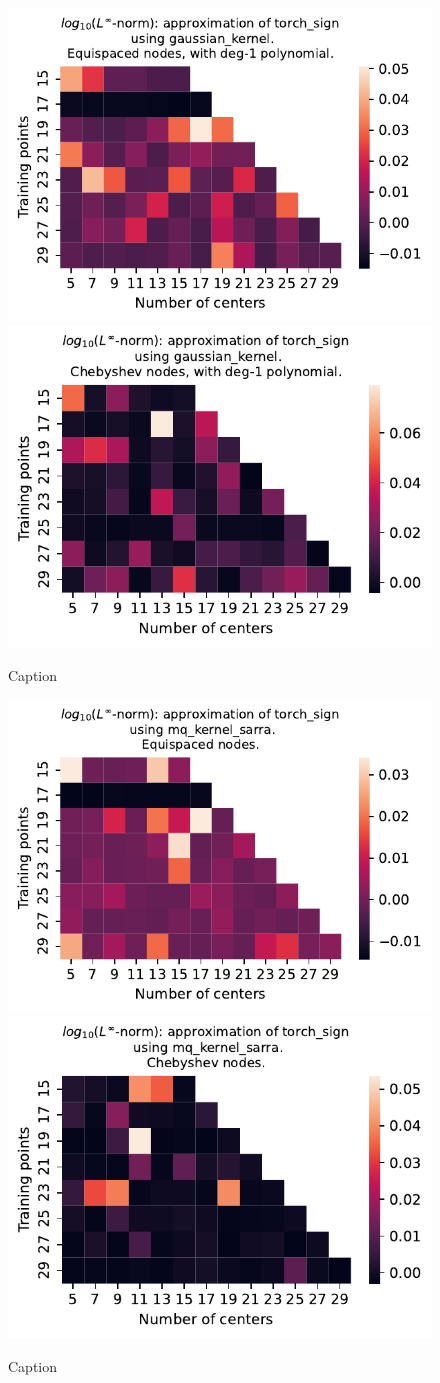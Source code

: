 \documentclass[12pt]{report} %
\begin{document}
\begin{figure}[ht]
    \centering
    
    \includegraphics[width=.49\textwidth]{imagenes/experiments/1d/variational/torch_sign-Kgaussian_kernel-Poly-Equi.pdf}
    \includegraphics[width=.49\textwidth]{imagenes/experiments/1d/variational/torch_sign-Kgaussian_kernel-Poly-Cheb.pdf}
    \caption{Caption}
    \label{fig:torch-sign-gaussian-poly}
\end{figure}


\begin{figure}[ht]
    \centering
    
    \includegraphics[width=.49\textwidth]{imagenes/experiments/1d/variational/torch_sign-Kmq_kernel_sarra-Equi.pdf}
    \includegraphics[width=.49\textwidth]{imagenes/experiments/1d/variational/torch_sign-Kmq_kernel_sarra-Cheb.pdf}
    \caption{Caption}
    \label{fig:torch-sign-sarra}
\end{figure}
\end{document}
